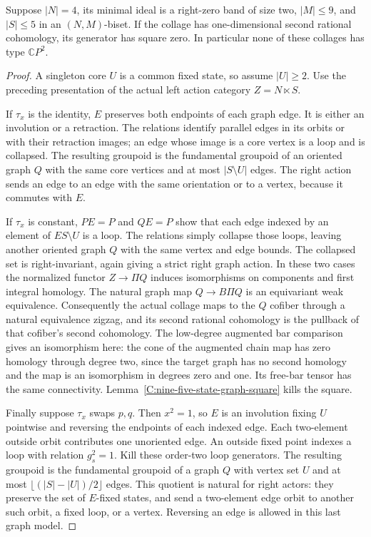 \begin{theorem}
\label{C:four-corner-two-band-five-states}
Suppose $|N|=4$, its minimal ideal is a right-zero band of
size two, $|M|\leq9$, and $|S|\leq5$ in an $(N,M)$-biset.
If the collage has one-dimensional second rational cohomology,
its generator has square zero. In particular none of these
collages has type $\mathbb CP^2$.
\end{theorem}
\begin{proof}
A singleton core $U$ is a common fixed state, so assume
$|U|\geq2$. Use the preceding presentation of the actual
left action category $Z=N\ltimes S$.

If $\tau_x$ is the identity, $E$ preserves both endpoints of
each graph edge. It is either an involution or a retraction.
The relations identify parallel edges in its orbits or with
their retraction images; an edge whose image is a core vertex
is a loop and is collapsed. The resulting groupoid is the
fundamental groupoid of an oriented graph $Q$ with the same
core vertices and at most $|S\setminus U|$ edges.
The right action sends an edge to an edge with the same
orientation or to a vertex, because it commutes with $E$.

If $\tau_x$ is constant, $PE=P$ and $QE=P$ show that each
edge indexed by an element of $ES\setminus U$ is a loop.
The relations simply collapse those loops, leaving another
oriented graph $Q$ with the same vertex and edge bounds.
The collapsed set is right-invariant, again giving a strict
right graph action. In these two cases the normalized
functor $Z\to\Pi Q$ induces isomorphisms on components and
first integral homology. The natural graph map
$Q\to B\Pi Q$ is an equivariant weak equivalence.
Consequently the actual collage maps to the $Q$ cofiber
through a natural equivalence zigzag, and its second
rational cohomology is the pullback of that cofiber's second
cohomology. The low-degree augmented bar comparison gives
an isomorphism here: the cone of the augmented chain map has
zero homology through degree two, since the target graph
has no second homology and the map is an isomorphism in
degrees zero and one. Its free-bar tensor has the same
connectivity. Lemma~\ref{C:nine-five-state-graph-square}
kills the square.

Finally suppose $\tau_x$ swaps $p,q$. Then $x^2=1$, so
$E$ is an involution fixing $U$ pointwise and reversing
the endpoints of each indexed edge. Each two-element
outside orbit contributes one unoriented edge. An outside
fixed point indexes a loop with relation $g_s^2=1$.
Kill these order-two loop generators. The resulting
groupoid is the fundamental groupoid of a graph $Q$ with
vertex set $U$ and at most
$\lfloor(|S|-|U|)/2\rfloor$ edges. This quotient is natural
for right actors: they preserve the set of $E$-fixed states,
and send a two-element edge orbit to another such orbit,
a fixed loop, or a vertex. Reversing an edge is allowed in
this last graph model.


\end{proof}
